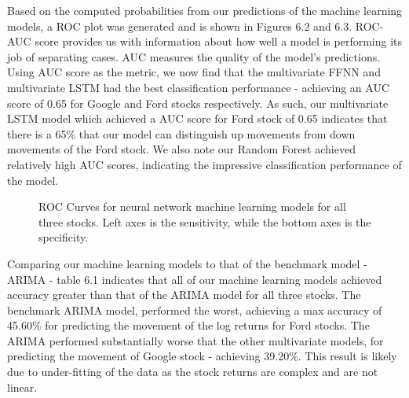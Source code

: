 Based on the computed probabilities from our predictions of the machine learning models, a ROC plot was generated and is shown in Figures 6.2 and 6.3.  ROC-AUC score provides us with information about how well a model is performing its job of separating cases. AUC measures the quality of the model's predictions. Using AUC score as the metric, we now find that the multivariate FFNN and multivariate LSTM had the best classification performance - achieving an AUC score of 0.65 for Google and Ford stocks respectively. As such, our multivariate LSTM model which achieved a AUC score for Ford stock of 0.65 indicates that there is a 65\% that our model can distinguish up movements from down movements of the Ford stock. We also note our Random Forest achieved relatively high AUC scores, indicating the impressive classification performance of the model. 



    
\begin{figure}[h]
    \centering
    \caption{\small{ROC Curves for neural network machine learning models for all three stocks. Left axes is the sensitivity, while the bottom axes is the specificity.}}
\label{}
\end{figure}


Comparing our machine learning models to that of the benchmark model - ARIMA - table 6.1 indicates that all of our machine learning models achieved accuracy greater than that of the ARIMA model for all three stocks. The benchmark ARIMA model, performed the worst, achieving a max accuracy of 45.60\% for predicting the movement of the log returns for Ford stocks. The ARIMA performed substantially worse that the other multivariate models, for predicting the movement of Google stock - achieving 39.20\%. This result is likely due to under-fitting of the data as the stock returns are complex and are not linear. 



